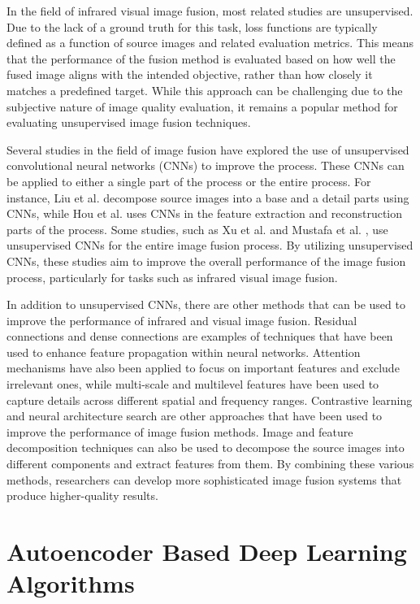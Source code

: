 In the field of infrared visual image fusion, most related studies are unsupervised. Due to the lack of a ground truth for this task, loss functions are typically defined as a function of source images and related evaluation metrics. This means that the performance of the fusion method is evaluated based on how well the fused image aligns with the intended objective, rather than how closely it matches a predefined target. While this approach can be challenging due to the subjective nature of image quality evaluation, it remains a popular method for evaluating unsupervised image fusion techniques.

Several studies in the field of image fusion have explored the use of unsupervised convolutional neural networks (CNNs) to improve the process. These CNNs can be applied to either a single part of the process or the entire process. For instance, Liu et al. \cite{liu2019infrared} decompose source images into a base and a detail parts using CNNs, while Hou et al. \cite{hou2020vif} uses CNNs in the feature extraction and reconstruction parts of the process. Some studies, such as Xu et al. \cite{xu2022cufd} and Mustafa et al. \cite{mustafa2020infrared}, use unsupervised CNNs for the entire image fusion process. By utilizing unsupervised CNNs, these studies aim to improve the overall performance of the image fusion process, particularly for tasks such as infrared visual image fusion.

In addition to unsupervised CNNs, there are other methods that can be used to improve the performance of infrared and visual image fusion. Residual connections \cite{he2016deep} and dense connections \cite{huang2017densely} are examples of techniques that have been used to enhance feature propagation within neural networks. Attention mechanisms \cite{mnih2014recurrent} have also been applied to focus on important features and exclude irrelevant ones, while multi-scale and multilevel features have been used to capture details across different spatial and frequency ranges. Contrastive learning \cite{hinton2006dimensionality} and neural architecture search \cite{zoph2017neural} are other approaches that have been used to improve the performance of image fusion methods. Image and feature decomposition techniques can also be used to decompose the source images into different components and extract features from them. By combining these various methods, researchers can develop more sophisticated image fusion systems that produce higher-quality results.

\section{Autoencoder Based Deep Learning Algorithms}


